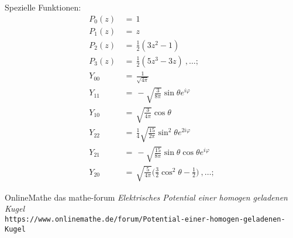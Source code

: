 \documentclass[titlepage,11pt,a4paper,ngerman]{report}
\begin{document}
\noindent
Spezielle Funktionen:
\begin{align*}
P_0(z)\,&=\,1\\
P_1(z)\,&=\,z\\
P_2(z)\,&=\,\frac{1}{2}(3z^2-1)\\
P_3(z)\,&=\,\frac{1}{2}(5z^3-3z)\ ,\dots;\\
Y_{00}\,&=\,\frac{1}{\sqrt{4\pi}}\\
Y_{11}\,&=\,-\sqrt{\frac{3}{8\pi}}\sin\theta e^{i\varphi}\\
Y_{10}\,&=\,\sqrt{\frac{3}{4\pi}}\cos\theta\\
Y_{22}\,&=\,\frac{1}{4}\sqrt{\frac{15}{2\pi}}\sin^2\theta e^{2i\varphi}\\
Y_{21}\,&=\,-\sqrt{\frac{15}{8\pi}}\sin\theta\cos\theta e^{i\varphi}\\
Y_{20}\,&=\,\sqrt{\frac{5}{4\pi}}\Bigg(\frac{3}{2}\cos^2\theta-\frac{1}{2}\Bigg)\ ,\dots;
\end{align*}

\begin{thebibliography}{9}
OnlineMathe das mathe-forum
\textit{Elektrisches Potential einer homogen geladenen Kugel}
\\\texttt{https://www.onlinemathe.de/forum/Potential-einer-homogen-geladenen-Kugel}
\end{thebibliography}
\end{document}
